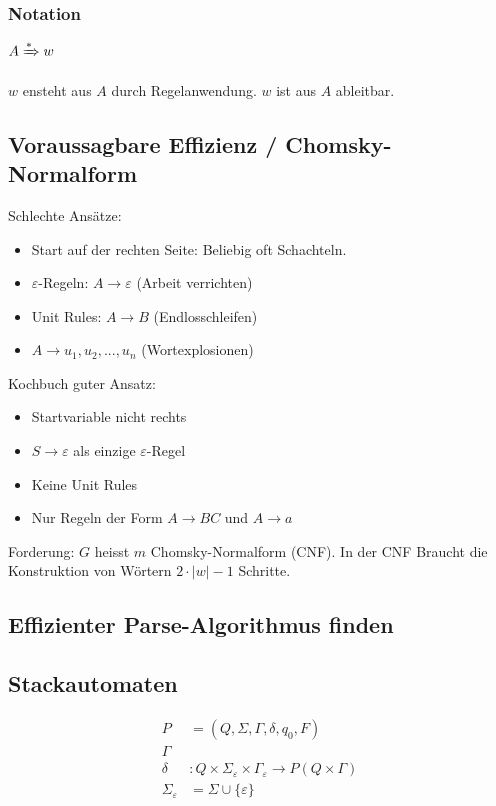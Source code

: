 \subsubsection{Notation}

$A \xRightarrow{\ast} w$

$w$ ensteht aus $A$ durch Regelanwendung. $w$ ist aus $A$ ableitbar.

\subsection{Voraussagbare Effizienz / Chomsky-Normalform}
Schlechte Ansätze:
\begin{itemize}
	\item Start auf der rechten Seite: Beliebig oft Schachteln.
	\item $\varepsilon$-Regeln: $A \to \varepsilon$ (Arbeit verrichten)
	\item Unit Rules: $A \to B$ (Endlosschleifen)
	\item $A \to u_1,u_2,...,u_n$ (Wortexplosionen)
\end{itemize}

Kochbuch guter Ansatz:

\begin{itemize}
	\item Startvariable nicht rechts
	\item $S \to \varepsilon$ als einzige $\varepsilon$-Regel
	\item Keine Unit Rules
	\item Nur Regeln der Form $A \to BC$ und $A \to a$
\end{itemize}

Forderung: $G$ heisst $m$ Chomsky-Normalform (CNF). In der CNF Braucht die Konstruktion von Wörtern $2 \cdot |w| -1$ Schritte.

 \subsection{Effizienter Parse-Algorithmus finden}
 

\subsection{Stackautomaten}

\begin{align*}
P &= (Q, \Sigma, \Gamma, \delta, q_0, F) \\
\Gamma & \\
\delta&: Q \times \Sigma_\varepsilon \times \Gamma_\varepsilon \to P(Q \times \Gamma) \\
\Sigma_\varepsilon &= \Sigma \cup \{ \varepsilon \}
\end{align*}

